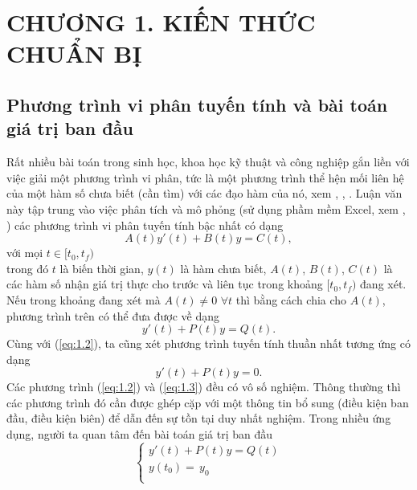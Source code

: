 \section*{CHƯƠNG 1.  KIẾN THỨC CHUẨN BỊ}
\setcounter{section}{1}
\setcounter{figure}{0}
\setcounter{table}{0}
\subsection{Phương trình vi phân tuyến tính và bài toán giá trị ban đầu}
Rất nhiều bài toán trong sinh học, khoa học kỹ thuật và công nghiệp gắn liền với việc giải một phương trình vi phân, tức là một phương trình thể hện mối liên hệ của một hàm số chưa biết (cần tìm) với các đạo hàm của nó, xem \cite{ref1}, \cite{ref4}, \cite{ref6}. Luận văn này tập trung vào việc phân tích và mô phỏng (sử dụng phầm mềm Excel, xem \cite{ref2}, \cite{ref5}) các phương trình vi phân tuyến tính bậc nhất có dạng                                
\begin{equation}
	A(t)y'(t)+B(t)y=C(t),
	\label{eq:1.1}
\end{equation}
với mọi $  t \in [{t}_{0},{{t}_{f}})$       \\
trong đó $t$ là biến thời gian, $y(t)$ là hàm chưa biết, $A(t)$, $B(t)$, $C(t)$ là các hàm số nhận giá trị thực cho trước và liên tục trong khoảng    $[t_0, t_f)$        đang xét. \\
Nếu trong khoảng đang xét mà $A(t)\ne 0\,\,\forall t$ thì bằng cách chia cho $A(t)$, phương trình trên có thể đưa được về dạng         
\begin{equation}
	y'(t)+P(t)y=Q(t).
	\label{eq:1.2}
\end{equation}
Cùng với (\ref{eq:1.2}), ta cũng xét phương trình tuyến tính thuần nhất tương ứng có dạng 
\begin{equation}
	y'(t)+P(t)y=0.
	\label{eq:1.3}
\end{equation}
Các phương trình (\ref{eq:1.2}) và (\ref{eq:1.3}) đều có vô số nghiệm. Thông thường thì các phương trình đó cần được ghép cặp với một thông tin bổ sung (điều kiện ban đầu, điều kiện biên) để dẫn đến sự tồn tại duy nhất nghiệm.  Trong nhiều ứng dụng, người ta quan tâm đến bài toán giá trị ban đầu  
\begin{equation}
	\left\{ \begin{array}{l}
	y'(t)+P(t)y=Q(t) \\ 
	y({{t}_{0}})=\,{{y}_{0}} \\ 
\end{array} \right.
\label{eq:1.4}
\end{equation}
